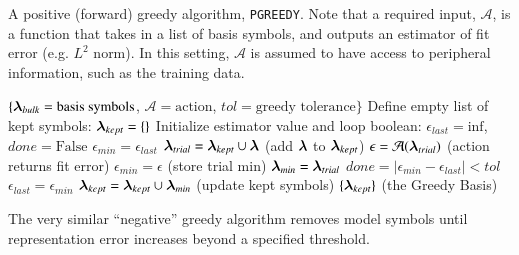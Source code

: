 \documentclass[twocolumn,aps,prd,floatfix,preprintnumbers,a4paper,nofootinbib,
superscriptaddress,10pt]{revtex4-1}
\def\pgreedy{\texttt{PGREEDY}}
\begin{document}
{\scriptsize
\begin{algorithm}[H]
  \caption{A positive (forward) greedy algorithm, \pgreedy{}. Note that a required input, $\mathcal{A}$, is a function that takes in a list of basis symbols, and outputs an estimator of fit error (e.g. $L^2$ norm). In this setting, $\mathcal{A}$ is assumed to have access to peripheral information, such as the training data.}
  \label{alg:pgreedy}
  \begin{algorithmic}[1]
     $ \{ {\bm{\lambda}}_{bulk} = \text{basis symbols}$, $\mathcal{A} = \text{action}$, $tol=\text{greedy tolerance}\}$
    \vskip 10pt
    \State Define empty list of kept symbols: ${\bm{\lambda}}_{kept} = \{\}$
    \State Initialize estimator value and loop boolean: $\epsilon_{last} = \mathrm{inf}$, $done = \text{False}$
      \State $\epsilon_{min} = \epsilon_{last}$
        \State ${\bm{\lambda}}_{trial} = {\bm{\lambda}}_{kept} \cup {\bm{\lambda}}$ {\hskip0.525in} (add ${\bm{\lambda}}$ to ${\bm{\lambda}}_{kept}$)
        \State $\epsilon = \mathcal{A}({\bm{\lambda}}_{trial})$ {\hskip0.70in} (action returns fit error)
          \State $\epsilon_{min} = \epsilon$  {\hskip0.825in} (store trial min)
          \State ${\bm{\lambda}}_{min} = {\bm{\lambda}}_{trial}$
        \EndIf
      \EndFor
      \State $done = |\epsilon_{min}-\epsilon_{last}|<tol$ %
        \State $\epsilon_{last} = \epsilon_{min}$
        \State ${\bm{\lambda}}_{kept} = {\bm{\lambda}}_{kept} \cup {\bm{\lambda}}_{min}$ {\hskip0.4in} (update kept symbols)
      \EndIf
    \EndWhile
    \vskip 10pt
     $\{ {\bm{\lambda}}_{kept} \}$ (the Greedy Basis)
  \end{algorithmic}
\end{algorithm}
}
%
\par The very similar ``negative'' greedy algorithm removes model symbols until representation error increases beyond a specified threshold.
%
%
%
%
\end{document}
